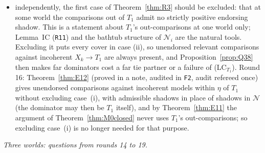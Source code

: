 \documentclass[11pt]{article}
\theoremstyle{definition}
\theoremstyle{remark}
\newcommand{\src}[1]{\texttt{#1}}
\begin{document}
\begin{itemize}[leftmargin=*]
\item independently, the first case of Theorem~\ref{thm:R3} should be excluded: that at some world the comparisons out of $T_1$ admit no strictly positive endorsing shadow. This is a statement about $T_1$'s out-comparisons at one world only; Lemma~IC (\src{R11}) and the bathtub structure of $\mathcal N_i$ are the natural tools. Excluding it puts every cover in case (ii), so unendorsed relevant comparisons against incoherent $X_k\to T_1$ are always present, and Proposition~\ref{prop:Q38} then makes far dominators cost a far tie partner or a failure of (LC$_{T_1}$). Round 16: Theorem~\ref{thm:E12} (proved in a note, audited in \src{F2}, audit refereed once) gives unendorsed comparisons against incoherent models within $\eta$ of $T_1$ without excluding case~(i), with admissible shadows in place of shadows in $\mathcal N$ (the dominator may then be $T_1$ itself), and by Theorem~\ref{thm:E11} the argument of Theorem~\ref{thm:M0closed} never uses $T_1$'s out-comparisons; so excluding case~(i) is no longer needed for that purpose.
\end{itemize}
\emph{Three worlds: questions from rounds 14 to 19.}
\end{document}
